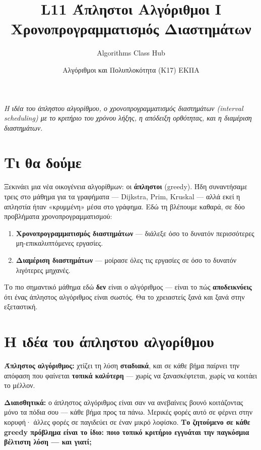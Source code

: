 \documentclass[11pt,a4paper]{article}
\title{\textbf{L11 \textperiodcentered{} Άπληστοι Αλγόριθμοι I}\\[2pt]
\large Χρονοπρογραμματισμός Διαστημάτων}
\author{Algorithms Class Hub}
\date{\small Αλγόριθμοι και Πολυπλοκότητα (K17) \textperiodcentered{} ΕΚΠΑ}
\begin{document}
\maketitle

\begin{center}\itshape\small
Η ιδέα του άπληστου αλγορίθμου, ο χρονοπρογραμματισμός διαστημάτων (interval
scheduling) με το κριτήριο του χρόνου λήξης, η απόδειξη ορθότητας, και η
διαμέριση διαστημάτων.
\end{center}

\section{Τι θα δούμε}

Ξεκινάει μια νέα οικογένεια αλγορίθμων: οι \textbf{άπληστοι} (greedy). Ήδη
συναντήσαμε τρεις στο μάθημα για τα γραφήματα --- Dijkstra, Prim, Kruskal ---
αλλά εκεί η απληστία ήταν «κρυμμένη» μέσα στο γράφημα. Εδώ τη βλέπουμε καθαρά, σε
δύο προβλήματα χρονοπρογραμματισμού:
\begin{enumerate}
  \item \textbf{Χρονοπρογραμματισμός διαστημάτων} --- διάλεξε όσο το δυνατόν
  περισσότερες μη-επικαλυπτόμενες εργασίες.
  \item \textbf{Διαμέριση διαστημάτων} --- μοίρασε όλες τις εργασίες σε όσο το
  δυνατόν λιγότερες μηχανές.
\end{enumerate}

Το πιο σημαντικό μάθημα εδώ \textbf{δεν} είναι ο αλγόριθμος --- είναι το πώς
\textbf{αποδεικνύεις} ότι ένας άπληστος αλγόριθμος είναι σωστός. Θα το χρειαστείς
ξανά και ξανά στην εξεταστική.

\section{Η ιδέα του άπληστου αλγορίθμου}

\begin{keypoint}
\textbf{Άπληστος αλγόριθμος:} χτίζει τη λύση \textbf{σταδιακά}, και σε κάθε βήμα
παίρνει την απόφαση που φαίνεται \textbf{τοπικά καλύτερη} --- χωρίς να
ξανασκέφτεται, χωρίς να κοιτάει το μέλλον.
\end{keypoint}

\begin{intuition}
\textbf{Διαισθητικά:} ο άπληστος αλγόριθμος είναι σαν να ανεβαίνεις βουνό
κοιτάζοντας μόνο τα πόδια σου --- κάθε βήμα προς τα πάνω. Μερικές φορές αυτό σε
φέρνει στην κορυφή· άλλες φορές σε παγιδεύει σε έναν μικρό λοφίσκο. \textbf{Το
ζητούμενο σε κάθε greedy πρόβλημα είναι το ίδιο: ποιο τοπικό κριτήριο εγγυάται
την παγκόσμια βέλτιστη λύση --- και γιατί;}
\end{intuition}
\end{document}
